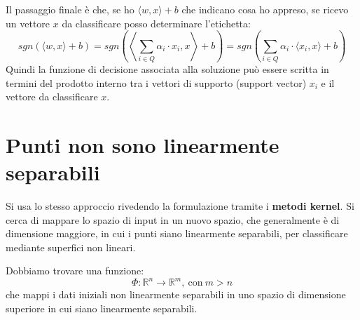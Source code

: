Il passaggio finale è che, se ho $\langle w, x \rangle + b$ che indicano cosa ho
appreso, se ricevo un vettore $x$ da classificare posso determinare l'etichetta:
\begin{equation}
    sgn(\langle w, x \rangle + b) = sgn\left(\left\langle \sum_{i \in Q} \alpha_i \cdot x_i, x \right\rangle + b \right) = sgn\left(\sum_{i \in Q} \alpha_i \cdot \langle x_i, x\rangle + b \right)
\end{equation}
Quindi la funzione di decisione associata alla soluzione può essere scritta in
termini del prodotto interno tra i vettori di supporto (support vector) $x_i$ e
il vettore da classificare $x$.
\section{Punti non sono linearmente separabili}
Si usa lo stesso approccio rivedendo la formulazione tramite i \textbf{metodi kernel}.
Si cerca di mappare lo spazio di input in un nuovo spazio, che generalmente è
di dimensione maggiore, in cui i punti siano linearmente separabili, per classificare
mediante superfici non lineari.

Dobbiamo trovare una funzione:
\begin{equation}
    \Phi: \mathbb{R}^n \to \mathbb{R}^m, \ \text{con} \ m > n
\end{equation}
che mappi i dati iniziali non linearmente separabili in uno spazio di dimensione
superiore in cui siano linearmente separabili.

